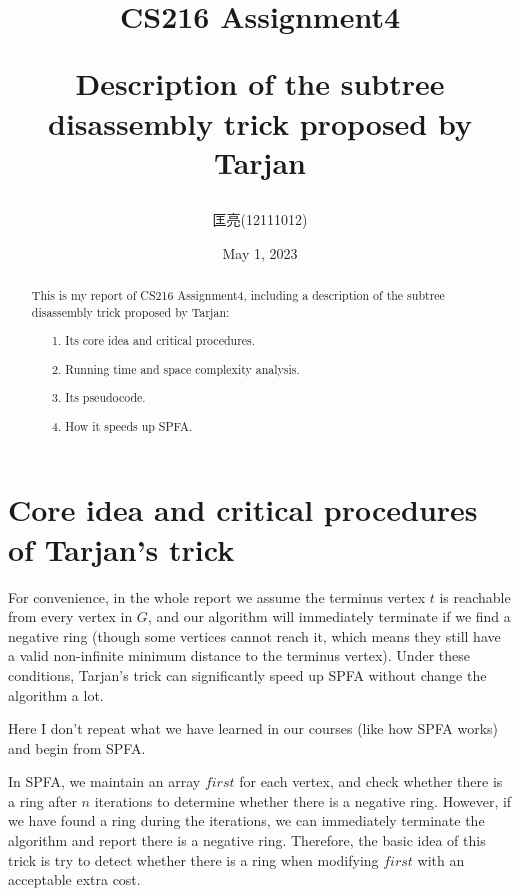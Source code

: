\documentclass{article}
\title{CS216 Assignment4 \\ {\begin{large} Description of the subtree disassembly trick proposed by Tarjan \end{large}}}  %
\author{匡亮(12111012)}
\date{May 1, 2023}  %
\begin{document}
\maketitle

\renewcommand\abstractname{Abstract}
\begin{abstract}

This is my report of CS216 Assignment4, including a description of the subtree disassembly trick proposed by Tarjan:

\begin{itemize}
    \item[1.] Its core idea and critical procedures.
    \item[2.] Running time and space complexity analysis.
    \item[3.] Its pseudocode.
    \item[4.] How it speeds up SPFA.
\end{itemize}

\end{abstract}

\newpage %

\renewcommand\contentsname{Contents}
\tableofcontents

\newpage  %

\section{Core idea and critical procedures of Tarjan's trick}

For convenience, in the whole report we assume the terminus vertex $t$ is reachable from every vertex in $G$, and our algorithm will immediately terminate if we find a negative ring (though some vertices cannot reach it, which means they still have a valid non-infinite minimum distance to the terminus vertex). Under these conditions, Tarjan's trick can significantly speed up SPFA without change the algorithm a lot.

Here I don't repeat what we have learned in our courses (like how SPFA works) and begin from SPFA.

In SPFA, we maintain an array $first$ for each vertex, and check whether there is a ring after $n$ iterations to determine whether there is a negative ring. However, if we have found a ring during the iterations, we can immediately terminate the algorithm and report there is a negative ring. Therefore, the basic idea of this trick is try to detect whether there is a ring when modifying $first$ with an acceptable extra cost.
\end{document}

